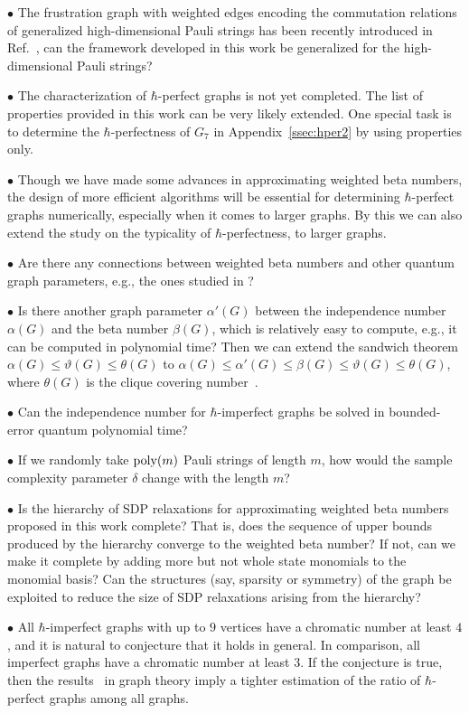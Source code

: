 \documentclass[
12pt,
prx,
aps,
reprint,
a4paper,
longbibliograph,
nofootinbib,
nobibnotes,
superscriptaddress
]{revtex4-2}
\theoremstyle{definition}
\begin{document}
$\bullet$ The frustration graph with weighted edges encoding the commutation relations of generalized high-dimensional Pauli strings has been recently introduced in Ref.~\cite{Makuta2025FrustrationGF}, can the framework developed in this work be generalized for the high-dimensional Pauli strings?

$\bullet$ The characterization of $\hbar$-perfect graphs is not yet completed. The list of properties provided in this work can be very likely extended. One special task is to determine the $\hbar$-perfectness of $G_7$ in Appendix~\ref{ssec:hper2} by using properties only.

$\bullet$ Though we have made some advances in approximating weighted beta numbers, the design of more efficient algorithms will be essential for determining $\hbar$-perfect graphs numerically, especially when it comes to larger graphs. 
By this we can also extend the study on the typicality of $\hbar$-perfectness, to larger graphs.


$\bullet$ Are there any connections between weighted beta numbers and other quantum graph parameters, e.g., the ones studied in \cite{gribling2018bounds}?

$\bullet$ Is there another graph parameter $\alpha'(G)$ between the independence number $\alpha(G)$ and the beta number $\beta(G)$, which is relatively easy to compute, e.g., it can be computed in polynomial time? Then we can extend the sandwich theorem $\alpha(G)\le \vartheta(G) \le \theta(G)$ to $\alpha(G)\le \alpha'(G) \le \beta(G) \le \vartheta(G) \le \theta(G)$, where $\theta(G)$ is the clique covering number~\cite{Diestel2025GraphT}. 

$\bullet$ Can the independence number for $\hbar$-imperfect graphs be solved in bounded-error quantum polynomial time?

$\bullet$ If we randomly take ${\rm poly}(m)$ Pauli strings of length $m$, how would the sample complexity parameter $\delta$ change with the length $m$?

$\bullet$ Is the hierarchy of SDP relaxations for approximating weighted beta numbers proposed in this work complete? That is, does the sequence of upper bounds produced by the hierarchy converge to the weighted beta number? If not, can we make it complete by adding more but not whole state monomials to the monomial basis? Can the structures (say, sparsity or symmetry) of the graph be exploited to reduce the size of SDP relaxations arising from the hierarchy? 

$\bullet$ All $\hbar$-imperfect graphs with up to $9$ vertices have a chromatic number at least $4$, and it is natural to conjecture that it holds in general. In comparison, all imperfect graphs have a chromatic number at least $3$. If the conjecture is true, then the results~\cite{Balogh2004TheNO} in graph theory imply a tighter estimation of the ratio of $\hbar$-perfect graphs among all graphs.
\end{document}

